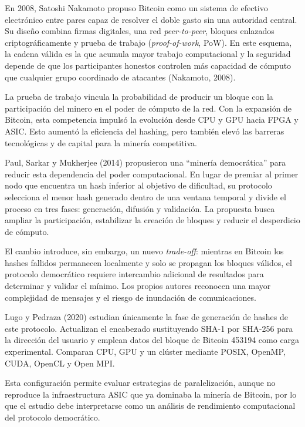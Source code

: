 \documentclass[spanish,11pt]{article}
\begin{document}
En 2008, Satoshi Nakamoto propuso Bitcoin como un sistema de efectivo electrónico entre pares 
capaz de resolver el doble gasto sin una autoridad central. Su diseño combina firmas digitales, 
una red \emph{peer-to-peer}, bloques enlazados criptográficamente y prueba de 
trabajo (\emph{proof-of-work}, PoW). En este esquema, la cadena válida es la que acumula mayor 
trabajo computacional y la seguridad depende de que los participantes honestos 
controlen más capacidad de cómputo que cualquier grupo coordinado de atacantes (Nakamoto, 2008).

La prueba de trabajo vincula la probabilidad de producir un bloque con la 
participación del minero en el poder de cómputo de la red. Con la expansión de Bitcoin, 
esta competencia impulsó la evolución desde CPU y GPU hacia FPGA y ASIC. Esto aumentó 
la eficiencia del hashing, pero también elevó las barreras tecnológicas y de capital 
para la minería competitiva.

Paul, Sarkar y Mukherjee (2014) propusieron una ``minería democrática'' para reducir esta 
dependencia del poder computacional. En lugar de premiar al primer nodo que encuentra un hash 
inferior al objetivo de dificultad, su protocolo selecciona el menor hash generado dentro de 
una ventana temporal y divide el proceso en tres fases: generación, difusión y validación. 
La propuesta busca ampliar la participación, estabilizar la creación de bloques y reducir el 
desperdicio de cómputo.

El cambio introduce, sin embargo, un nuevo \emph{trade-off}: mientras en Bitcoin los hashes 
fallidos permanecen localmente y solo se propagan los bloques válidos, el 
protocolo democrático requiere intercambio adicional de resultados para determinar y validar 
el mínimo. Los propios autores reconocen una mayor complejidad de mensajes y el
riesgo de inundación de comunicaciones.

Lugo y Pedraza (2020) estudian únicamente la fase de generación 
de hashes de este protocolo. Actualizan el encabezado sustituyendo SHA-1 por SHA-256 para la 
dirección del usuario y emplean datos del bloque de Bitcoin 453194 como carga experimental. 
Comparan CPU, GPU y un clúster mediante POSIX, OpenMP, CUDA, OpenCL y Open MPI.

Esta configuración permite evaluar estrategias de paralelización, aunque no 
reproduce la infraestructura ASIC que ya dominaba la minería de Bitcoin, por lo que el estudio 
debe interpretarse como un análisis de rendimiento computacional del protocolo democrático.
\end{document}

